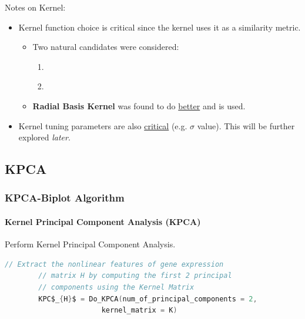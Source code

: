 \documentclass[serif]{beamer}
\begin{document}
	\begin{frame}
		\begin{block}{Notes on Kernel:}
			\begin{itemize}
			\item
			{
			{
				Kernel function choice is critical since the kernel
				uses it as a similarity metric.
			}
				\begin{itemize}
					\item
					{
						{
							Two natural candidates were considered:
						}
							\begin{enumerate}
							
								\item
								{ 
									\color<1,3-4>{blockgray}{Polynomial Kernel}
								}
								\item
								{ 
									\color<1,3-4>{blockgray}{Radial Basis Kernel}
								}
							\end{enumerate}
						
					}
					\item
					{
						\color<1-2,4>{blockgray}
						{
							\textbf{Radial Basis Kernel} was found 
							to do \underline{better} and is used.
						}
					}
				\end{itemize}
			}
			\item
			{
				\color<1-3>{blockgray}
				{
					Kernel tuning parameters are also \underline{critical} 
					(e.g. $\sigma$ value). This will be further 
					explored \emph{later}.
				}
			}
			\end{itemize}
		\end{block}
	\end{frame}
	
	\subsection{KPCA}
	
	\begin{frame}[t, fragile]
		\frametitle{KPCA-Biplot Algorithm}
		\framesubtitle{Kernel Principal Component Analysis \textbf{(KPCA)}}
		
		Perform Kernel Principal Component Analysis.
		
	\begin{lstlisting}[mathescape, language=C]
		// Extract the nonlinear features of gene expression 
		// matrix H by computing the first 2 principal 
		// components using the Kernel Matrix
		KPC$_{H}$ = Do_KPCA(num_of_principal_components = 2,
		               kernel_matrix = K)
	\end{lstlisting}

	\end{frame}
\end{document}
